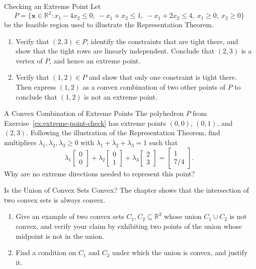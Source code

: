 \begin{ex}{Checking an Extreme Point}{}
\label{ex:extreme-point-check}
Let
\[
P = \{ \mathbf{x} \in \mathbb{R}^2 : x_1 - 4x_2 \leq 0,\ -x_1 + x_2 \leq 1,\ -x_1 + 2x_2 \leq 4,\ x_1 \geq 0,\ x_2 \geq 0 \}
\]
be the feasible region used to illustrate the Representation Theorem.
\begin{enumerate}
    \item Verify that \( (2,3) \in P \), identify the constraints that are tight there, and show that the tight rows are linearly independent. Conclude that \( (2,3) \) is a vertex of \( P \), and hence an extreme point.
    \item Verify that \( (1,2) \in P \) and show that only one constraint is tight there. Then express \( (1,2) \) as a convex combination of two other points of \( P \) to conclude that \( (1,2) \) is not an extreme point.
\end{enumerate}
\exrefs{\S\ref{sec:algebraic-vertex-proof}, \S\ref{sec:convexity}}
\end{ex}

\begin{ex}{A Convex Combination of Extreme Points}{}
\label{ex:rep-theorem-combo}
The polyhedron \( P \) from Exercise~\ref{ex:extreme-point-check} has extreme points \( (0,0) \), \( (0,1) \), and \( (2,3) \). Following the illustration of the Representation Theorem, find multipliers \( \lambda_1, \lambda_2, \lambda_3 \geq 0 \) with \( \lambda_1 + \lambda_2 + \lambda_3 = 1 \) such that
\[
\lambda_1 \begin{bmatrix} 0 \\ 0 \end{bmatrix} + \lambda_2 \begin{bmatrix} 0 \\ 1 \end{bmatrix} + \lambda_3 \begin{bmatrix} 2 \\ 3 \end{bmatrix} = \begin{bmatrix} 1 \\ 7/4 \end{bmatrix}.
\]
Why are no extreme directions needed to represent this point?
\end{ex}


\begin{ex}{Is the Union of Convex Sets Convex?}{}
\label{ex:union-convex}
The chapter shows that the intersection of two convex sets is always convex.
\begin{enumerate}
    \item Give an example of two convex sets \( C_1, C_2 \subseteq \mathbb{R}^2 \) whose union \( C_1 \cup C_2 \) is not convex, and verify your claim by exhibiting two points of the union whose midpoint is not in the union.
    \item Find a condition on \( C_1 \) and \( C_2 \) under which the union is convex, and justify it.
\end{enumerate}
\exrefs{\S\ref{sec:convexity}}
\end{ex}


